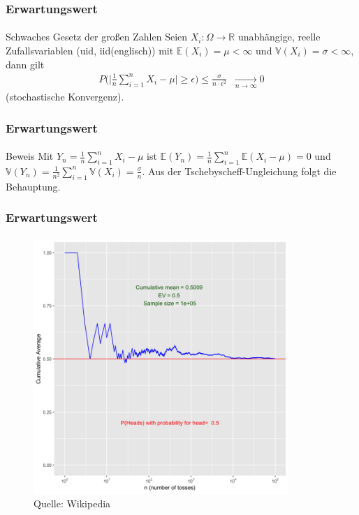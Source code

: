 \documentclass{beamer}
\begin{document}
\begin{frame}
    \frametitle{Erwartungswert}
\framesubtitle{}
\begin{block}{Schwaches Gesetz der großen Zahlen}
Seien $X_i : \Omega \to \mathbb{R}$ unabhängige, reelle Zufallsvariablen (uid, iid(englisch)) mit $\mathbb{E}(X_i) = \mu < \infty$ und $\mathbb{V}(X_i) = \sigma < \infty$, dann gilt
\begin{align*}
P \bigl  ( \bigl | \frac{1}{n} \sum_{i=1}^{n} X_i - \mu \bigr |  \geq \epsilon \bigr) \leq \frac{\sigma}{ n \cdot \epsilon^2} \; \; \underset{n \to \infty}{\longrightarrow} 0
\end{align*}
(stochastische Konvergenz). 
\end{block}
 \end{frame}


\begin{frame}
    \frametitle{Erwartungswert}
\framesubtitle{}
\begin{block}{Beweis}
Mit $Y_n =  \frac{1}{n} \sum_{i=1}^{n}  X_i - \mu$ ist $\mathbb{E}(Y_n) =  \frac{1}{n} \sum_{i=1}^{n} \mathbb{E}( X_i - \mu) = 0$ und 
$\mathbb{V}(Y_n) =  \frac{1}{n^2} \sum_{i=1}^{n} \mathbb{V}( X_i ) = \frac{\sigma}{n}$. Aus der Tschebyscheff-Ungleichung folgt die Behauptung.
\end{block}
 \end{frame}


\begin{frame}
    \frametitle{Erwartungswert}
\framesubtitle{}

\begin{figure}[htp]
      \centering
    \includegraphics[width=0.86\textwidth]{img/sgdz}
      \caption{Quelle: Wikipedia}
\end{figure}
 \end{frame}
\end{document}
